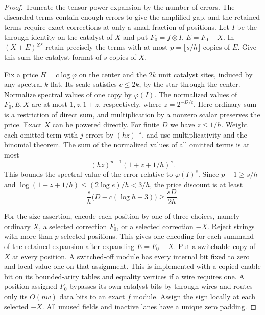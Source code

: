\begin{proof}
Truncate the tensor-power expansion by the number of errors. The
discarded terms contain enough errors to give the amplified gap, and the
retained terms require exact corrections at only a small fraction of
positions. Let $I$ be the through identity on the catalyst of $X$ and put
$F_0=f\otimes I$, $E=F_0-X$. In $(X+E)^{\otimes s}$ retain precisely
the terms with at most $p=\lfloor s/h\rfloor$ copies of $E$. Give this
sum the catalyst format of $s$ copies of $X$.

Fix a price $H=c\log\varphi$ on the center and the $2k$ unit catalyst
sites, induced by any spectral $k$-flat. Its scale satisfies $c\le2k$, by the star through the center.
Normalize spectral values of one copy by $\varphi(I)$. The normalized
values of $F_0,E,X$ are at most $1,z,1+z$, respectively, where
$z=2^{-D/c}$. Here ordinary sum is a restriction of direct sum, and
multiplication by a nonzero scalar preserves the price. Exact $X$ can
be powered directly. For finite $D$ we have $z\le1/h$. Weight each
omitted term with $j$ errors by $(hz)^{-j}$, and use multiplicativity
and the binomial theorem. The sum of the normalized values of all
omitted terms is at most
\[
                 (hz)^{p+1}(1+z+1/h)^s .
\]
This bounds the spectral value of the error relative to
$\varphi(I)^s$. Since $p+1\ge s/h$ and
$\log(1+z+1/h)\le (2\log e)/h<3/h$, the price discount is at least
\[
         \frac{s}{h}\bigl(D-c(\log h+3)\bigr)\ge \frac{sD}{2h}.
\]

For the size assertion, encode each position by one of three choices,
namely ordinary $X$, a selected correction $F_0$, or a selected
correction $-X$. Reject strings with more than $p$ selected positions. This gives
one encoding for each summand of the retained expansion after expanding
$E=F_0-X$. Put a switchable copy of $X$ at every position. A switched-off
module has every internal bit fixed to zero and local value one on
that assignment. This is implemented with a copied enable bit on its
bounded-arity tables and equality vertices if a wire requires one.
A position assigned $F_0$ bypasses its own catalyst bits by through
wires and routes only its $O(nw)$ data bits to an exact $f$ module.
Assign the sign locally at each selected $-X$. All unused fields and
inactive lanes have a unique zero padding.


\end{proof}
